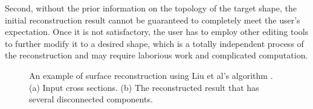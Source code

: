 Second, without the  prior information on the topology of the
target shape, the initial reconstruction result cannot be
guaranteed to completely meet the user's expectation. Once it is
not satisfactory, the user has to employ other editing tools to
further modify it to a desired shape, which is a totally
independent process of the reconstruction and may require laborious
work and complicated computation.

\begin{figure} [htbp]
  \centering
  \caption{An example of surface reconstruction using Liu et al's
  algorithm \cite{LBDLJ08}.
  (a) Input cross sections.
  (b) The reconstructed result that has several disconnected components.}
  \label{fig:anatomy-ju}
\end{figure}


